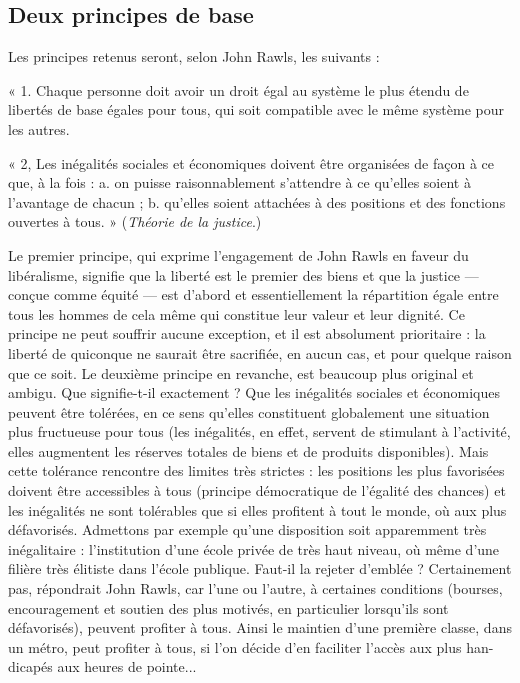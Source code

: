 \subsection{Deux principes de base}


Les principes retenus seront, selon John
Rawls, les suivants :

« 1. Chaque personne doit avoir un droit
égal au système le plus étendu de
libertés de base égales pour tous, qui
soit compatible avec le même système
pour les autres.

« 2, Les inégalités sociales et économiques
doivent être organisées de façon à ce que,
%
à la fois : a. on puisse raisonnablement
s'attendre à ce qu'elles soient à l'avantage
de chacun ; b. qu’elles soient attachées à
des positions et des fonctions ouvertes à
tous. » ({\it Théorie de la justice}.)

Le premier principe, qui exprime l’engagement de John Rawls en faveur du libéralisme,
 signifie que la liberté est le premier des biens et que la justice — conçue
comme équité — est d'abord et essentiellement la répartition égale entre tous
les hommes de cela même qui constitue
leur valeur et leur dignité. Ce principe ne
peut souffrir aucune exception, et il est
absolument prioritaire : la liberté de quiconque ne saurait être sacrifiée, en aucun
cas, et pour quelque raison que ce soit.
Le deuxième principe en revanche, est
beaucoup plus original et ambigu. Que
signifie-t-il exactement ? Que les inégalités sociales et économiques peuvent
être tolérées, en ce sens qu’elles constituent globalement une situation plus
 fructueuse pour tous (les inégalités, en effet,
servent de stimulant à l’activité, elles
augmentent les réserves totales de biens
et de produits disponibles). Mais cette
tolérance rencontre des limites très
strictes : les positions les plus favorisées
doivent être accessibles à tous (principe
démocratique de l'égalité des chances) et
les inégalités ne sont tolérables que si
elles profitent à tout le monde, où aux
plus défavorisés. Admettons par exemple
qu'une disposition soit apparemment très
inégalitaire : l'institution d'une école privée de très haut niveau, où même d’une
filière très élitiste dans l’école publique.
Faut-il la rejeter d'emblée ? Certainement
pas, répondrait John Rawls, car l’une ou
l'autre, à certaines conditions (bourses,
encouragement et soutien des plus
motivés, en particulier lorsqu'ils sont
défavorisés), peuvent profiter à tous.
Ainsi le maintien d'une première classe,
dans un métro, peut profiter à tous, si l'on
décide d'en faciliter l'accès aux plus han-
dicapés aux heures de pointe...

